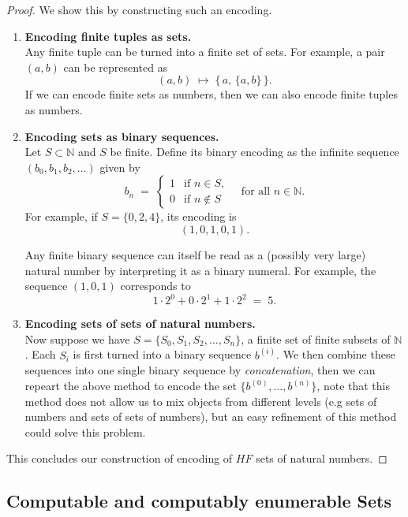 \documentclass{pracalicmgr2025}
\theoremstyle{plain}            %
\theoremstyle{remark}           %
\theoremstyle{definition}       %
\begin{document}
\begin{proof}
We show this by constructing such an encoding.

\begin{enumerate}
    \item \textbf{Encoding finite tuples as sets.} \\
    Any finite tuple can be turned into a finite set of sets. For example, a pair $(a,b)$ can be represented as  
    $$
        (a,b) \;\longmapsto\; \{\, a,\, \{a,b\} \,\}.
    $$  
    If we can encode finite sets as numbers, then we can also encode finite tuples as numbers.

    \item \textbf{Encoding sets as binary sequences.} \\ 
    Let $S \subset \mathbb{N}$ and $S$ be finite. Define its binary encoding as the infinite sequence $(b_0,b_1,b_2,\dots)$ given by  
    $$
        b_n \;=\;
        \begin{cases}
            1 & \text{if } n \in S, \\[4pt]
            0 & \text{if } n \notin S
        \end{cases}
        \quad\text{for all } n \in \mathbb{N}.
    $$
    For example, if $S = \{0,2,4\}$, its encoding is  
    $$
        (1,0,1,0,1).
    $$

    Any finite binary sequence can itself be read as a (possibly very large) natural number by interpreting it as a binary numeral. For example, the sequence $(1,0,1)$ corresponds to  
    $$
        1 \cdot 2^0 + 0 \cdot 2^1 + 1 \cdot 2^2 \;=\; 5.
    $$

    \item \textbf{Encoding sets of sets of natural numbers.} \\
    Now suppose we have $S = \{S_0,S_1,S_2,\dots,S_n\}$, a finite set of finite subsets of $\mathbb{N}$. Each $S_i$ is first turned into a binary sequence $b^{(i)}$. We then combine these sequences into one single binary sequence by \emph{concatenation}, then we can repeart the above method to encode the set $\{b^{(0)},\dots,b^{(n)}\}$, note that this method does not allow us to mix objects from different levels (e.g sets of numbers and sets of sets of numbers), but an easy refinement of this method could solve this problem.
\end{enumerate}
    This concludes our construction of encoding of $HF$ sets of natural numbers. 
\end{proof}

\subsection{Computable and computably enumerable Sets}
\end{document}
